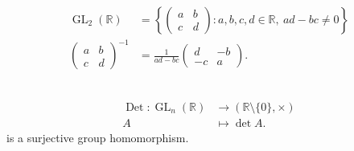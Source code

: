 \begin{example} ~\vspace*{-1.5\baselineskip}
    \begin{align*}
        \operatorname{GL}_2(\mathbb{R}) &= \left\{ \begin{pmatrix}
        a & b \\
        c & d
        \end{pmatrix} : a, b, c, d \in \mathbb{R},\ ad - bc \neq 0 \right\} \\
        \begin{pmatrix}
            a & b \\
            c & d
            \end{pmatrix}^{-1} &= \frac{1}{ad - bc} \begin{pmatrix}
        d & -b \\
        -c & a
        \end{pmatrix}.
    \end{align*}
\end{example} 

\begin{proposition}\label{prp:9} ~\vspace*{-1.5\baselineskip}
    \begin{align*}
        \operatorname{Det} : \operatorname{GL}_n(\mathbb{R}) &\to (\mathbb{R} \setminus \{0\}, \times) \\
        A &\mapsto \det A.
    \end{align*} is a surjective group homomorphism.
\end{proposition} 

